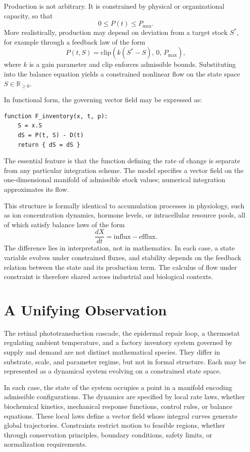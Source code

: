 \documentclass[12pt]{book}
\begin{document}
Production is not arbitrary. It is constrained by physical or organizational
capacity, so that
\[
0 \le P(t) \le P_{\max}.
\]
More realistically, production may depend on deviation from a target stock
$S^*$, for example through a feedback law of the form
\[
P(t,S) = \mathrm{clip}\!\left( k(S^* - S),\, 0,\, P_{\max} \right),
\]
where $k$ is a gain parameter and $\mathrm{clip}$ enforces admissible bounds.
Substituting into the balance equation yields a constrained nonlinear flow on
the state space $S \in \mathbb{R}_{\ge 0}$.

In functional form, the governing vector field may be expressed as:

\begin{verbatim}
function F_inventory(x, t, p):
    S = x.S
    dS = P(t, S) - D(t)
    return { dS = dS }
\end{verbatim}

The essential feature is that the function defining the rate of change is
separate from any particular integration scheme. The model specifies a vector
field on the one-dimensional manifold of admissible stock values; numerical
integration approximates its flow.

This structure is formally identical to accumulation processes in physiology,
such as ion concentration dynamics, hormone levels, or intracellular resource
pools, all of which satisfy balance laws of the form
\[
\frac{dX}{dt} = \text{influx} - \text{efflux}.
\]
The difference lies in interpretation, not in mathematics. In each case, a
state variable evolves under constrained fluxes, and stability depends on the
feedback relation between the state and its production term. The calculus of
flow under constraint is therefore shared across industrial and biological
contexts.

\section{A Unifying Observation}

The retinal phototransduction cascade, the epidermal repair loop, a thermostat regulating ambient temperature, and a factory inventory system governed by supply and demand are not distinct mathematical species. They differ in substrate, scale, and parameter regime, but not in formal structure. Each may be represented as a dynamical system evolving on a constrained state space.

In each case, the state of the system occupies a point in a manifold encoding admissible configurations. The dynamics are specified by local rate laws, whether biochemical kinetics, mechanical response functions, control rules, or balance equations. These local laws define a vector field whose integral curves generate global trajectories. Constraints restrict motion to feasible regions, whether through conservation principles, boundary conditions, safety limits, or normalization requirements.
\end{document}
